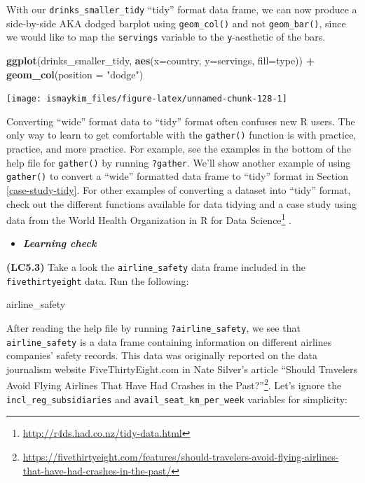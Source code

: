 \documentclass[12pt, krantz2,]{krantz}
\makeatletter
\newenvironment{Shaded}{\begin{snugshade}}{\end{snugshade}}
\newcommand{\DataTypeTok}[1]{\textcolor[rgb]{0.27,0.27,0.27}{#1}}
\newcommand{\KeywordTok}[1]{\textcolor[rgb]{0.27,0.27,0.27}{\textbf{#1}}}
\newcommand{\NormalTok}[1]{#1}
\newcommand{\OperatorTok}[1]{\textcolor[rgb]{0.43,0.43,0.43}{\textbf{#1}}}
\newcommand{\StringTok}[1]{\textcolor[rgb]{0.5,0.5,0.5}{#1}}
\renewcommand{\href}[2]{#2\footnote{\url{#1}}}
\newenvironment{kframe}{%
\medskip{}
\setlength{\fboxsep}{.8em}
 \def\at@end@of@kframe{}%
 \ifinner\ifhmode%
  \def\at@end@of@kframe{\end{minipage}}%
  \begin{minipage}{\columnwidth}%
 \fi\fi%
 \def\FrameCommand##1{\hskip\@totalleftmargin \hskip-\fboxsep
 \colorbox{shadecolor}{##1}\hskip-\fboxsep
     \hskip-\linewidth \hskip-\@totalleftmargin \hskip\columnwidth}%
 \MakeFramed {\advance\hsize-\width
   \@totalleftmargin\z@ \linewidth\hsize
   \@setminipage}}%
 {\par\unskip\endMakeFramed%
 \at@end@of@kframe}
\renewenvironment{Shaded}{\begin{kframe}}{\end{kframe}}
\newenvironment{rmdblock}[1]
  {\begin{shaded*}
  \begin{itemize}
  \renewcommand{\labelitemi}{
    \raisebox{-.7\height}[0pt][0pt]{
    }
  }
  \item
  }
  {
  \end{itemize}
  \end{shaded*}
  }
\newenvironment{learncheck}
  {\begin{rmdblock}{warning}}
  {\end{rmdblock}}
\makeatother
\begin{document}
With our \texttt{drinks\_smaller\_tidy} ``tidy'' format data frame, we can now produce a side-by-side AKA dodged barplot using \texttt{geom\_col()} and not \texttt{geom\_bar()}, since we would like to map the \texttt{servings} variable to the \texttt{y}-aesthetic of the bars.

\begin{Shaded}
\begin{Highlighting}[]
\KeywordTok{ggplot}\NormalTok{(drinks_smaller_tidy, }\KeywordTok{aes}\NormalTok{(}\DataTypeTok{x=}\NormalTok{country, }\DataTypeTok{y=}\NormalTok{servings, }\DataTypeTok{fill=}\NormalTok{type)) }\OperatorTok{+}
\StringTok{  }\KeywordTok{geom_col}\NormalTok{(}\DataTypeTok{position =} \StringTok{"dodge"}\NormalTok{)}
\end{Highlighting}
\end{Shaded}

\begin{center}\texttt{[image: ismaykim\_files/figure-latex/unnamed-chunk-128-1]} \end{center}

Converting ``wide'' format data to ``tidy'' format often confuses new R users. The only way to learn to get comfortable with the \texttt{gather()} function is with practice, practice, and more practice. For example, see the examples in the bottom of the help file for \texttt{gather()} by running \texttt{?gather}. We'll show another example of using \texttt{gather()} to convert a ``wide'' formatted data frame to ``tidy'' format in Section \ref{case-study-tidy}. For other examples of converting a dataset into ``tidy'' format, check out the different functions available for data tidying and a case study using data from the World Health Organization in \href{http://r4ds.had.co.nz/tidy-data.html}{R for Data Science} \citep{rds2016}.

\begin{learncheck}
\textbf{\emph{Learning check}}
\end{learncheck}

\textbf{(LC5.3)} Take a look the \texttt{airline\_safety} data frame included in the \texttt{fivethirtyeight} data. Run the following:

\begin{Shaded}
\begin{Highlighting}[]
\NormalTok{airline_safety}
\end{Highlighting}
\end{Shaded}

After reading the help file by running \texttt{?airline\_safety}, we see that \texttt{airline\_safety} is a data frame containing information on different airlines companies' safety records. This data was originally reported on the data journalism website FiveThirtyEight.com in Nate Silver's article \href{https://fivethirtyeight.com/features/should-travelers-avoid-flying-airlines-that-have-had-crashes-in-the-past/}{``Should Travelers Avoid Flying Airlines That Have Had Crashes in the Past?''}. Let's ignore the \texttt{incl\_reg\_subsidiaries} and \texttt{avail\_seat\_km\_per\_week} variables for simplicity:
\end{document}
